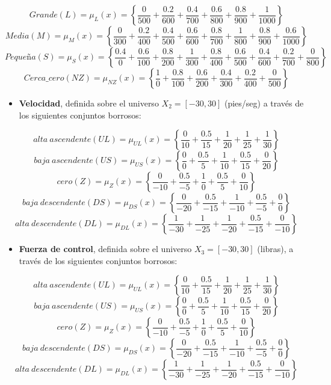\documentclass[
]{article}
\providecommand{\tightlist}{%
  \setlength{\itemsep}{0pt}\setlength{\parskip}{0pt}}
\begin{document}
\[Grande\left(L\right)=\mu_{L}\left(x\right)=\left\{ \frac{0}{500}+\frac{0.2}{600}+\frac{0.4}{700}+\frac{0.6}{800}+\frac{0.8}{900}+\frac{1}{1000}\right\} \]
\[Media\left(M\right)=\mu_{M}\left(x\right)=\left\{ \frac{0}{300}+\frac{0.2}{400}+\frac{0.4}{500}+\frac{0.6}{600}+\frac{0.8}{700}+\frac{1}{800}+\frac{0.8}{900}+\frac{0.6}{1000}\right\} \]
\[Pequeña\left(S\right)=\mu_{S}\left(x\right)=\left\{ \frac{0.4}{0}+\frac{0.6}{100}+\frac{0.8}{200}+\frac{1}{300}+\frac{0.8}{400}+\frac{0.6}{500}+\frac{0.4}{600}+\frac{0.2}{700}+\frac{0}{800}\right\} \]
\[Cerca\_cero\left(NZ\right)=\mu_{NZ}\left(x\right)=\left\{ \frac{1}{0}+\frac{0.8}{100}+\frac{0.6}{200}+\frac{0.4}{300}+\frac{0.2}{400}+\frac{0}{500}\right\} \]

\begin{itemize}
\tightlist
\item
  \textbf{Velocidad}, definida sobre el universo
  \(X_{2}=\left[-30,30\right]\) (pies/seg) a través de los siguientes
  conjuntos borrosos:
\end{itemize}

\[alta\ ascendente\left(UL\right)=\mu_{UL}\left(x\right)=\left\{ \frac{0}{10}+\frac{0.5}{15}+\frac{1}{20}+\frac{1}{25}+\frac{1}{30}\right\} \]
\[baja\ ascendente\left(US\right)=\mu_{US}\left(x\right)=\left\{ \frac{0}{0}+\frac{0.5}{5}+\frac{1}{10}+\frac{0.5}{15}+\frac{0}{20}\right\} \]
\[cero\left(Z\right)=\mu_{Z}\left(x\right)=\left\{ \frac{0}{-10}+\frac{0.5}{-5}+\frac{1}{0}+\frac{0.5}{5}+\frac{0}{10}\right\} \]
\[baja\ descendente\left(DS\right)=\mu_{DS}\left(x\right)=\left\{ \frac{0}{-20}+\frac{0.5}{-15}+\frac{1}{-10}+\frac{0.5}{-5}+\frac{0}{0}\right\} \]
\[alta\ descendente\left(DL\right)=\mu_{DL}\left(x\right)=\left\{ \frac{1}{-30}+\frac{1}{-25}+\frac{1}{-20}+\frac{0.5}{-15}+\frac{0}{-10}\right\} \]

\begin{itemize}
\tightlist
\item
  \textbf{Fuerza de control}, definida sobre el universo
  \(X_{3}=\left[-30,30\right]\) (libras), a través de los siguientes
  conjuntos borrosos:
\end{itemize}

\[alta\ ascendente\left(UL\right)=\mu_{UL}\left(x\right)=\left\{ \frac{0}{10}+\frac{0.5}{15}+\frac{1}{20}+\frac{1}{25}+\frac{1}{30}\right\} \]
\[baja\ ascendente\left(US\right)=\mu_{US}\left(x\right)=\left\{ \frac{0}{0}+\frac{0.5}{5}+\frac{1}{10}+\frac{0.5}{15}+\frac{0}{20}\right\} \]
\[cero\left(Z\right)=\mu_{Z}\left(x\right)=\left\{ \frac{0}{-10}+\frac{0.5}{-5}+\frac{1}{0}+\frac{0.5}{5}+\frac{0}{10}\right\} \]
\[baja\ descendente\left(DS\right)=\mu_{DS}\left(x\right)=\left\{ \frac{0}{-20}+\frac{0.5}{-15}+\frac{1}{-10}+\frac{0.5}{-5}+\frac{0}{0}\right\} \]
\[alta\ descendente\left(DL\right)=\mu_{DL}\left(x\right)=\left\{ \frac{1}{-30}+\frac{1}{-25}+\frac{1}{-20}+\frac{0.5}{-15}+\frac{0}{-10}\right\} \]
\end{document}
